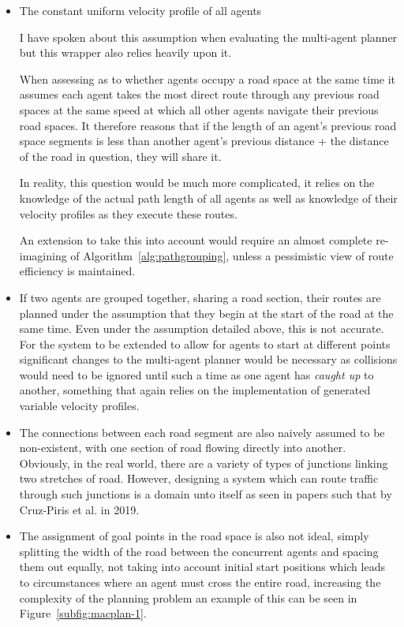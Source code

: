 \begin{itemize}
  \item The constant uniform velocity profile of all agents

        I have spoken about this assumption when evaluating the multi-agent planner but this wrapper also relies heavily upon it.

        When assessing as to whether agents occupy a road space at the same time it assumes each agent takes the most direct route through any previous road spaces at the same speed at which all other agents navigate their previous road spaces. It therefore reasons that if the length of an agent's previous road space segments is less than another agent's previous distance + the distance of the road in question, they will share it.

        In reality, this question would be much more complicated, it relies on the knowledge of the actual path length of all agents as well as knowledge of their velocity profiles as they execute these routes.

        An extension to take this into account would require an almost complete re-imagining of Algorithm~\ref{alg:pathgrouping}, unless a pessimistic view of route efficiency is maintained.


  \item If two agents are grouped together, sharing a road section, their routes are planned under the assumption that they begin at the start of the road at the same time. Even under the assumption detailed above, this is not accurate. For the system to be extended to allow for agents to start at different points significant changes to the multi-agent planner would be necessary as collisions would need to be ignored until such a time as one agent has \textit{caught up} to another, something that again relies on the implementation of generated variable velocity profiles.

  \item The connections between each road segment are also naively assumed to be non-existent, with one section of road flowing directly into another. Obviously, in the real world, there are a variety of types of junctions linking two stretches of road. However, designing a system which can route traffic through such junctions is a domain unto itself as seen in papers such that by Cruz-Piris et al.\cite{cruz-pirisAutomatedOptimizationIntersections2019} in 2019.
  \item The assignment of goal points in the road space is also not ideal, simply splitting the width of the road between the concurrent agents and spacing them out equally, not taking into account initial start positions which leads to circumstances where an agent must cross the entire road, increasing the complexity of the planning problem an example of this can be seen in Figure~\ref{subfig:macplan-1}.
\end{itemize}

